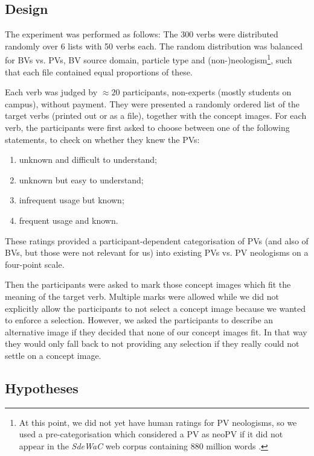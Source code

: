 \documentclass[output=paper]{langsci/langscibook}
\begin{document}
\subsection{Design}
\label{sec:design}

The experiment was performed as follows: The 300 verbs were
distributed randomly over 6 lists with 50 verbs each. The random
distribution was balanced for BVs vs. PVs, BV source domain, particle
type and (non-)neologism\footnote{At this point, we did not yet have
  human ratings for PV neologisms, so we used a pre-categorisation
  which considered a PV as neoPV if it did not appear in the
  \textit{SdeWaC} web corpus containing 880 million words
  \citep{Faass/Eckart:13}.}, such that each file contained equal
proportions of these.

Each verb was judged by ${\approx}20$ participants, non-experts (mostly
students on campus), without payment. They were presented a randomly
ordered list of the target verbs (printed out or as a file), together
with the concept images. For each verb, the participants were first
asked to choose between one of the following statements, to check on
whether they knew the PVs:
\begin{enumerate}
\item unknown and difficult to understand;
\item unknown but easy to understand;
\item infrequent usage but known;
\item frequent usage and known.
\end{enumerate}
These ratings provided a participant-dependent categorisation of PVs
(and also of BVs, but those were not relevant for us) into existing
PVs vs. PV neologisms on a four-point scale.

Then the participants were asked to mark those concept images which
fit the meaning of the target verb. Multiple marks were allowed
while we did not explicitly allow the participants to not select a
concept image because we wanted to enforce a selection. However, we
asked the participants to describe an alternative image if they
decided that none of our concept images fit. In that way they would
only fall back to not providing any selection if they really could not
settle on a concept image.


\subsection{Hypotheses}
\end{document}
